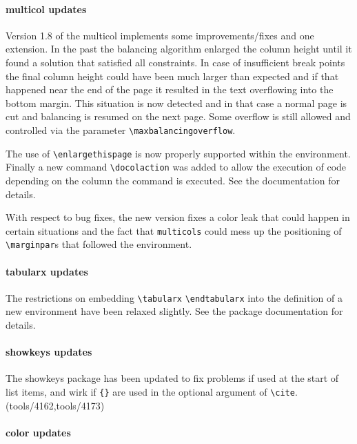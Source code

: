 \documentclass{ltnews}
\begin{document}
\paragraph{\textsf{multicol} updates}

Version 1.8 of the \textsf{multicol} implements some
improvements/fixes and one extension. In the past the balancing
algorithm enlarged the column height until it found a solution that
satisfied all constraints. In case of insufficient break points the
final column height could have been much larger than expected and if
that happened near the end of the page it resulted in the text
overflowing into the bottom margin. This situation is now detected and
in that case a normal page is cut and balancing is resumed on the next
page. Some overflow is still allowed and controlled via the parameter
\verb=\maxbalancingoverflow=.

The use of \verb=\enlargethispage= is now properly supported
within the environment. Finally a new command \verb=\docolaction= was
added to allow the execution of code depending on the column the
command is executed. See the documentation for details.

With respect to bug fixes, the new version fixes a color leak that
could happen in certain situations and the fact that
\texttt{multicols} could mess up the positioning of
\verb=\marginpar=s that followed the environment.

\paragraph{\textsf{tabularx} updates}

The restrictions on embedding \verb|\tabularx| \verb|\endtabularx|
into the definition of a new environment have been relaxed
slightly. See the package documentation for details.

\paragraph{\textsf{showkeys} updates}

The \textsf{showkeys} package has been updated to fix problems if used
at the start of list items, and wirk if \verb|{}| are used in the
optional argument of \verb|\cite|. (tools/4162,tools/4173)


\paragraph{\textsf{color} updates}
\end{document}
